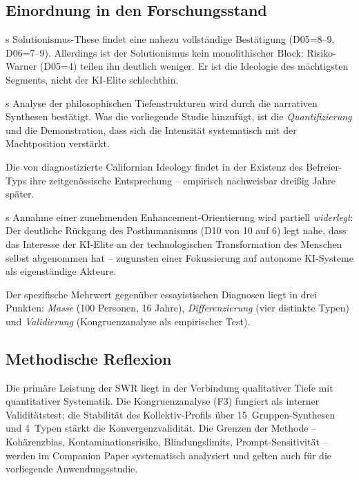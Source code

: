 \documentclass[12pt,a4paper]{article}
\begin{document}
\subsection{Einordnung in den Forschungsstand}
\label{sec:diskussion:einordnung}

\citeauthor{Morozov2013}s Solutionismus-These findet eine nahezu vollst\"andige Best\"atigung (D05=8--9, D06=7--9). Allerdings ist der Solutionismus kein monolithischer Block: Risiko-Warner (D05=4) teilen ihn deutlich weniger. Er ist die Ideologie des m\"achtigsten Segments, nicht der KI-Elite schlechthin.

\citeauthor{Daub2020}s Analyse der philosophischen Tiefenstrukturen wird durch die narrativen Synthesen best\"atigt. Was die vorliegende Studie hinzuf\"ugt, ist die \emph{Quantifizierung} und die Demonstration, dass sich die Intensit\"at systematisch mit der Machtposition verst\"arkt.

Die von \citet{BarbCam1996} diagnostizierte Californian Ideology findet in der Existenz des Befreier-Typs ihre zeitgen\"ossische Entsprechung -- empirisch nachweisbar drei\ss{}ig Jahre sp\"ater.

\citeauthor{Coeckelbergh2020}s Annahme einer zunehmenden Enhancement-Orientierung wird partiell \emph{widerlegt}: Der deutliche R\"uckgang des Posthumanismus (D10 von 10 auf 6) legt nahe, dass das Interesse der KI-Elite an der technologischen Transformation des Menschen selbst abgenommen hat -- zugunsten einer Fokussierung auf autonome KI-Systeme als eigenst\"andige Akteure.

Der spezifische Mehrwert gegen\"uber essayistischen Diagnosen liegt in drei Punkten: \emph{Masse} (100 Personen, 16 Jahre), \emph{Differenzierung} (vier distinkte Typen) und \emph{Validierung} (Kongruenzanalyse als empirischer Test).


\subsection{Methodische Reflexion}
\label{sec:diskussion:methodik}

Die prim\"are Leistung der SWR liegt in der Verbindung qualitativer Tiefe mit quantitativer Systematik. Die Kongruenzanalyse (F3) fungiert als interner Validit\"atstest; die Stabilit\"at des Kollektiv-Profils \"uber 15~Gruppen-Synthesen und 4~Typen st\"arkt die Konvergenzvalidit\"at. Die Grenzen der Methode -- Koh\"arenzbias, Kontaminationsrisiko, Blindungslimits, Prompt-Sensitivit\"at -- werden im Companion Paper \citep{Geiger2026SWR} systematisch analysiert und gelten auch f\"ur die vorliegende Anwendungsstudie.
\end{document}
